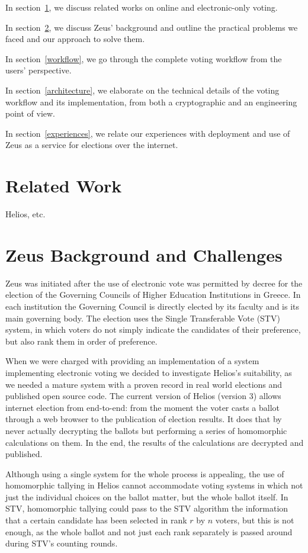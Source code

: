 \documentclass[letterpaper,10pt]{article}
\begin{document}
In section~\ref{related},
we discuss related works on online and electronic-only voting.

In section~\ref{challenges},
we discuss Zeus' background and outline the practical problems we faced
and our approach to solve them.

In section~\ref{workflow},
we go through the complete voting workflow from the users' perspective.

In section~\ref{architecture},
we elaborate on the technical details of the voting workflow and its
implementation, from both a cryptographic and an engineering point of
view.

In section~\ref{experiences},
we relate our experiences with deployment and use of Zeus as a service
for elections over the internet.

\section{Related Work}
\label{related}

Helios, etc.

\section{Zeus Background and Challenges}
\label{challenges}
Zeus was initiated after the use of electronic vote was permitted by
decree for the election of the Governing Councils of Higher Education
Institutions in Greece. In each institution the Governing Council is
directly elected by its faculty and is its main governing body. The
election uses the Single Transferable Vote (STV) system, in which
voters do not simply indicate the candidates of their preference, but
also rank them in order of preference. 

When we were charged with providing an implementation of a system
implementing electronic voting we decided to investigate Helios's
suitability, as we needed a mature system with a proven record in real
world elections and published open source code. The current version of
Helios (version 3) allows internet election from end-to-end: from the
moment the voter casts a ballot through a web browser to the
publication of election results. It does that by never actually
decrypting the ballots but performing a series of homomorphic
calculations on them. In the end, the results of the calculations are
decrypted and published. 

Although using a single system for the whole process is appealing, the
use of homomorphic tallying in Helios cannot accommodate voting
systems in which not just the individual choices on the ballot matter,
but the whole ballot itself. In STV, homomorphic tallying could pass
to the STV algorithm the information that a certain candidate has been
selected in rank $r$ by $n$ voters, but this is not enough, as the whole
ballot and not just each rank separately is passed around during STV's
counting rounds.
\end{document}
